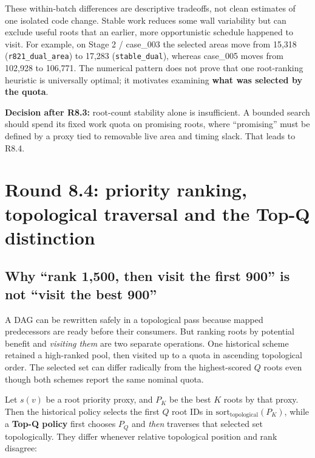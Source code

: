 These within-batch differences are descriptive tradeoffs, not clean estimates of one isolated code change. Stable work reduces some wall variability but can exclude useful roots that an earlier, more opportunistic schedule happened to visit. For example, on Stage 2 / case\_003 the selected areas move from 15,318 (\texttt{r821\_dual\_area}) to 17,283 (\texttt{stable\_dual}), whereas case\_005 moves from 102,928 to 106,771. The numerical pattern does not prove that one root-ranking heuristic is universally optimal; it motivates examining \textbf{what was selected by the quota}.

\begin{tcolorbox}[colback=ResearchBlue!6!white,colframe=ResearchSlate!55!white,boxrule=0.65pt,arc=1mm,breakable]
\textbf{Decision after R8.3:} root-count stability alone is insufficient. A bounded search should spend its fixed work quota on promising roots, where ``promising'' must be defined by a proxy tied to removable live area and timing slack. That leads to R8.4.
\end{tcolorbox}

\section{Round 8.4: priority ranking, topological traversal and the Top-Q distinction}\label{round-8.4-priority-ranking-topological-traversal-and-the-top-q-distinction}

\subsection{Why ``rank 1,500, then visit the first 900'' is not ``visit the best 900''}\label{why-rank-1500-then-visit-the-first-900-is-not-visit-the-best-900}

A DAG can be rewritten safely in a topological pass because mapped predecessors are ready before their consumers. But ranking roots by potential benefit and \emph{visiting them} are two separate operations. One historical scheme retained a high-ranked pool, then visited up to a quota in ascending topological order. The selected set can differ radically from the highest-scored \(Q\) roots even though both schemes report the same nominal quota.

Let \(s(v)\) be a root priority proxy, and \(P_K\) be the best \(K\) roots by that proxy. Then the historical policy selects the first \(Q\) root IDs in \(\mathrm{sort}_{\mathrm{topological}}(P_K)\), while a \textbf{Top-Q policy} first chooses \(P_Q\) and \emph{then} traverses that selected set topologically. They differ whenever relative topological position and rank disagree:

